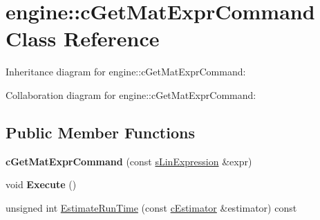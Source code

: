 \hypertarget{classengine_1_1cGetMatExprCommand}{\section{engine\-:\-:c\-Get\-Mat\-Expr\-Command Class Reference}
\label{classengine_1_1cGetMatExprCommand}
}


Inheritance diagram for engine\-:\-:c\-Get\-Mat\-Expr\-Command\-:


Collaboration diagram for engine\-:\-:c\-Get\-Mat\-Expr\-Command\-:
\subsection*{Public Member Functions}
\begin{DoxyCompactItemize}
\item 
\hypertarget{classengine_1_1cGetMatExprCommand_a5aa0b4ea3da91ed9b9438b12e409ecd7}{{\bfseries c\-Get\-Mat\-Expr\-Command} (const \hyperlink{structengine_1_1sLinExpression}{s\-Lin\-Expression} \&expr)}\label{classengine_1_1cGetMatExprCommand_a5aa0b4ea3da91ed9b9438b12e409ecd7}

\item 
\hypertarget{classengine_1_1cGetMatExprCommand_a29cf2191f93572f0d08f5515a7e0c499}{void {\bfseries Execute} ()}\label{classengine_1_1cGetMatExprCommand_a29cf2191f93572f0d08f5515a7e0c499}

\item 
unsigned int \hyperlink{classengine_1_1cGetMatExprCommand_a6a9c787618267539be3004983c3d1747}{Estimate\-Run\-Time} (const \hyperlink{classengine_1_1cEstimator}{c\-Estimator} \&estimator) const 
\end{DoxyCompactItemize}
